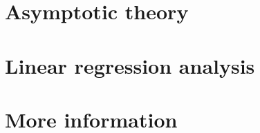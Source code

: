 \documentclass[11pt,notitlepage]{report}
\begin{document}
\part{Asymptotic theory}






\begin{appendices}

\end{appendices}

\part{Linear regression analysis}






\begin{appendices}

\end{appendices}

\part{More information}
\begin{appendices}


\end{appendices}


\end{document}
